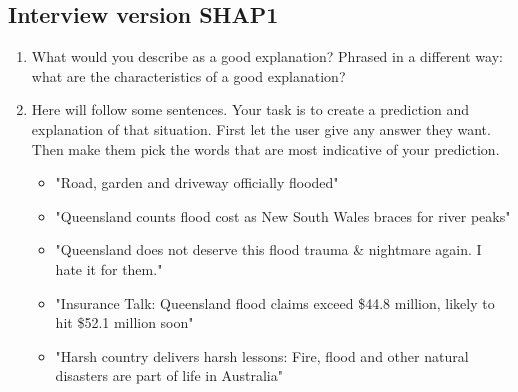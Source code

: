 \subsection{Interview version SHAP1}
\begin{enumerate}
    \item What would you describe as a good explanation? Phrased in a different way: what are the characteristics of a good explanation?

    \item Here will follow some sentences. Your task is to create a prediction and explanation of that situation. First let the user give any answer they want. Then make them pick the words that are most indicative of your prediction. \begin{itemize}
        \item "Road, garden and driveway officially flooded"
        \item "Queensland counts flood cost as New South Wales braces for river peaks"
        \item "Queensland does not deserve this flood trauma \& nightmare again. I hate it for them."
        \item "Insurance Talk: Queensland flood claims exceed \$44.8 million, likely to hit \$52.1 million soon"
        \item "Harsh country delivers harsh lessons: Fire, flood and other natural disasters are part of life in Australia"
    \end{itemize}


\end{enumerate}
